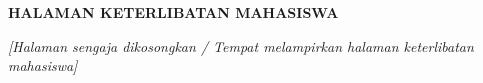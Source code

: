 \clearpage
{}
{}
\begin{center}
    {\fontsize{14}{17}\selectfont\bfseries HALAMAN KETERLIBATAN MAHASISWA\par}
\end{center}
\vspace{2cm}
\begin{center}
    \textit{[Halaman sengaja dikosongkan / Tempat melampirkan halaman keterlibatan mahasiswa]}
\end{center}
\clearpage
